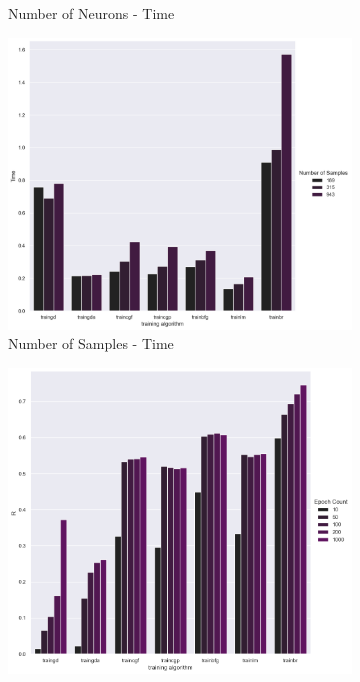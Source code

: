 \documentclass[11pt,conference,compsoc]{IEEEtran}
\begin{document}
\begin{figure}[]
\begin{subfigure}{0.33\linewidth}
        \caption{Number of Neurons - Time}
    \end{subfigure}
    \begin{subfigure}{0.33\linewidth}
        \includegraphics[width=\linewidth]{images/Samples-Time.png}
        \caption{Number of Samples - Time}
    \end{subfigure}
    \begin{subfigure}{0.33\linewidth}
        \includegraphics[width=\linewidth]{images/Epochs-R.png}

\end{subfigure}
\end{figure}
\end{document}
